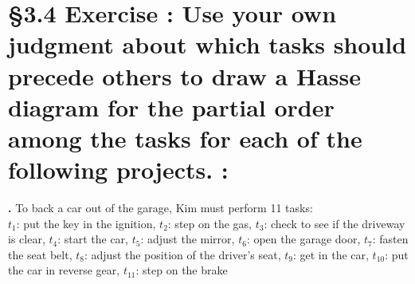 \documentclass[a4paper,11pt]{article}
\begin{document}
{\section*{\S 3.4 Exercise : Use your own judgment about which tasks should precede others to draw a Hasse
diagram for the partial order among the tasks for each of the following projects. :}
\setcounter{SubsectionCounter}{2}
\textbf{.}
To back a car out of the garage, Kim must perform 11 tasks:\\
\(t_1\): put the key in the ignition,
\(t_2\): step on the gas,
\(t_3\): check to see if the driveway is clear,
\(t_4\): start the car,
\(t_5\): adjust the mirror,
\(t_6\): open the garage door,
\(t_7\): fasten the seat belt,
\(t_8\): adjust the position of the driver’s seat,
\(t_9\): get in the car,
\(t_{10}\): put the car in reverse gear,
\(t_{11}\): step on the brake\\
\\
\newpage
\setcounter{ProblemCounter}{14}
}
\end{document}
